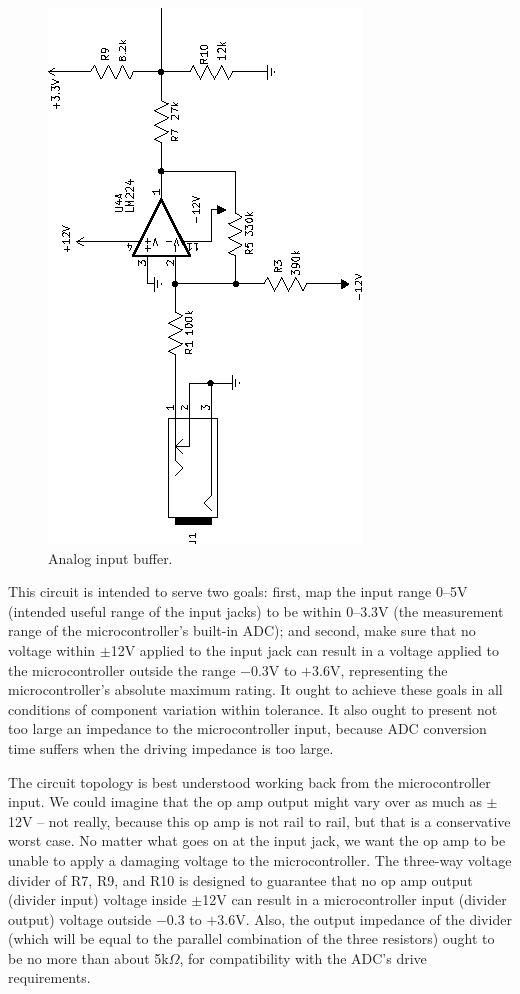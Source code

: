 \begin{figure}
{\centering\includegraphics[scale=2,rotate=-90]{opamp1.eps}\par}
\caption{Analog input buffer.}\label{fig:analog-in-buffer}
\end{figure}

This circuit is intended to serve two goals:  first, map the input range
0--5V (intended useful range of the input jacks) to be within 0--3.3V (the
measurement range of the microcontroller's built-in ADC); and second, make
sure that no voltage within $\pm$12V applied to the input jack can result in
a voltage applied to the microcontroller outside the range $-$0.3V to
$+$3.6V, representing the microcontroller's absolute maximum rating.  It
ought to achieve these goals in all conditions of component variation within
tolerance.  It also ought to present not too large an impedance to the
microcontroller input, because ADC conversion time suffers when the driving
impedance is too large.

The circuit topology is best understood working back from the
microcontroller input.  We could imagine that the op amp output might vary
over as much as $\pm$12V -- not really, because this op amp is not rail to
rail, but that is a conservative worst case.  No matter what goes on at the
input jack, we want the op amp to be unable to apply a damaging voltage to
the microcontroller.  The three-way voltage divider of R7, R9, and R10 is
designed to guarantee that no op amp output (divider input) voltage inside
$\pm$12V can result in a microcontroller input (divider output) voltage
outside $-$0.3 to $+$3.6V.  Also, the output impedance of the divider (which
will be equal to the parallel combination of the three resistors) ought to
be no more than about 5k$\Omega$, for compatibility with the ADC's drive
requirements.

